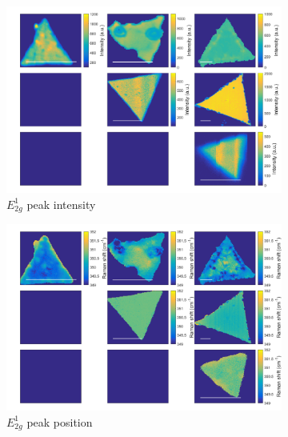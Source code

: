 \begin{figure}[h]
	\begin{center}
		\begin{subfigure}[b]{0.4\textwidth}
			\includegraphics[width=\textwidth]{PaperSIMapsIntensityE.png}
			\caption{$E^1_{2g}$ peak intensity}
			\label{fig:PaperSIMapsIntensityE}
		\end{subfigure}
		\quad
		\begin{subfigure}[b]{0.4\textwidth}
			\includegraphics[width=\textwidth]{PaperSIMapsPositionE.png}
			\caption{$E^1_{2g}$ peak position}
			\label{fig:PaperSIMapsPositionE}
		\end{subfigure}
		\hfill
		\begin{subfigure}[b]{0.4\textwidth}

\end{subfigure}
\end{center}
\end{figure}
